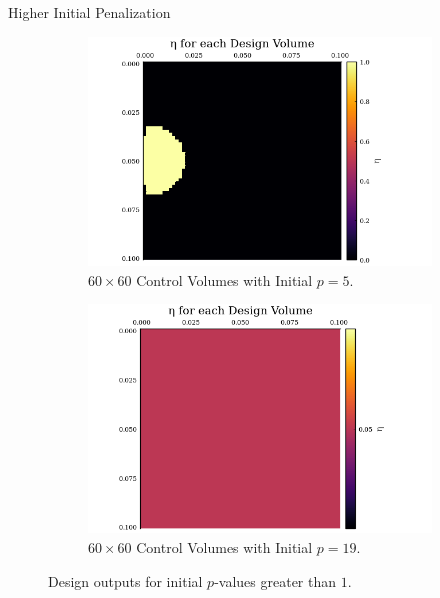 \documentclass[final]{beamer}
\begin{document}
\begin{frame}{Higher Initial Penalization}
	\begin{figure}
		\begin{subfigure}{0.45\textwidth}
			\includegraphics[width=1.1\linewidth]{60x60-start-p=5-1iters.png}
			\caption{$60\times 60$ Control Volumes with Initial $p=5$.}
			\label{fig:start_p=5}
		\end{subfigure}
		\begin{subfigure}{0.45\textwidth}
			\includegraphics[width=1.1\linewidth]{60x60-start-p=19-3iters.png}
			\caption{$60\times 60$ Control Volumes with Initial $p=19$.}
			\label{fig:start_p=19}
		\end{subfigure}
		\caption[Designs with Higher Initial $p$]{Design outputs for initial $p$-values greater than $1$.}
	\end{figure}
\end{frame}
\end{document}
